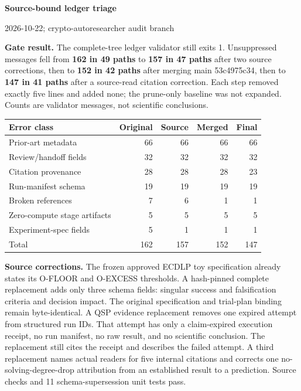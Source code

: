 \documentclass[10pt]{article}
\begin{document}
\begin{center}
{\Large\bfseries Source-bound ledger triage}\par
{\small 2026-10-22; crypto-autoresearcher audit branch}
\end{center}

\textbf{Gate result.} The complete-tree ledger validator still exits 1.
Unsuppressed messages fell from \textbf{162 in 49 paths} to
\textbf{157 in 47 paths} after two source corrections, then to
\textbf{152 in 42 paths} after merging main 53c4975c34, then to
\textbf{147 in 41 paths} after a source-read citation correction. Each step
removed exactly five lines and added none; the prune-only baseline was not expanded.
Counts are validator messages, not scientific conclusions.

\begin{center}
\begin{tabular}{>{\raggedright\arraybackslash}p{2.8in}rrrr}
\hline
Error class & Original & Source & Merged & Final \\
\hline
Prior-art metadata & 66 & 66 & 66 & 66 \\
Review/handoff fields & 32 & 32 & 32 & 32 \\
Citation provenance & 28 & 28 & 28 & 23 \\
Run-manifest schema & 19 & 19 & 19 & 19 \\
Broken references & 7 & 6 & 1 & 1 \\
Zero-compute stage artifacts & 5 & 5 & 5 & 5 \\
Experiment-spec fields & 5 & 1 & 1 & 1 \\
\hline
Total & 162 & 157 & 152 & 147 \\
\hline
\end{tabular}
\end{center}

\textbf{Source corrections.} The frozen approved ECDLP toy specification
already states its O-FLOOR and O-EXCESS thresholds. A hash-pinned complete
replacement adds only three schema fields: singular success and
falsification criteria and decision impact. The original specification and
trial-plan binding remain byte-identical. A QSP evidence replacement removes
one expired attempt from structured run IDs. That attempt has only a
claim-expired execution receipt, no run manifest, no raw result, and no
scientific conclusion. The replacement still cites the receipt and describes
the failed attempt. A third replacement names actual readers for five internal
citations and corrects one no-solving-degree-drop attribution from an established
result to a prediction. Source checks and 11 schema-supersession unit tests pass.
\end{document}
